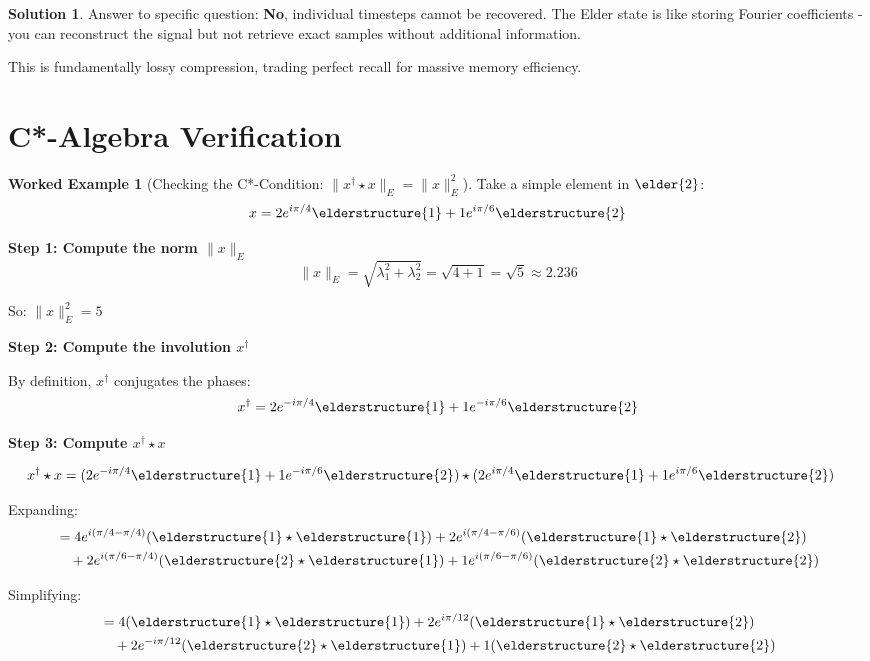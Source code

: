 \documentclass[12pt,a4paper]{article}
\theoremstyle{definition}
\newtheorem{solution}{Solution}[section]
\newtheorem{example}{Worked Example}[section]
\theoremstyle{remark}
\begin{document}
\begin{solution}
Answer to specific question: \textbf{No}, individual timesteps cannot be recovered. The Elder state is like storing Fourier coefficients - you can reconstruct the signal but not retrieve exact samples without additional information.

This is fundamentally lossy compression, trading perfect recall for massive memory efficiency.
\end{solution}

\newpage
\section{C*-Algebra Verification}

\begin{example}[Checking the C*-Condition: $\|x^{\dagger} \star x\|_E = \|x\|_E^2$]

Take a simple element in $\elder{2}$:
$$x = 2e^{i\pi/4} \elderstructure{1} + 1e^{i\pi/6} \elderstructure{2}$$

\textbf{Step 1: Compute the norm $\|x\|_E$}
$$\|x\|_E = \sqrt{\lambda_1^2 + \lambda_2^2} = \sqrt{4 + 1} = \sqrt{5} \approx 2.236$$

So: $\|x\|_E^2 = 5$

\textbf{Step 2: Compute the involution $x^{\dagger}$}

By definition, $x^{\dagger}$ conjugates the phases:
$$x^{\dagger} = 2e^{-i\pi/4} \elderstructure{1} + 1e^{-i\pi/6} \elderstructure{2}$$

\textbf{Step 3: Compute $x^{\dagger} \star x$}

\begin{align}
x^{\dagger} \star x &= (2e^{-i\pi/4} \elderstructure{1} + 1e^{-i\pi/6} \elderstructure{2}) \star (2e^{i\pi/4} \elderstructure{1} + 1e^{i\pi/6} \elderstructure{2})
\end{align}

Expanding:
\begin{align}
&= 4e^{i(\pi/4 - \pi/4)}(\elderstructure{1} \star \elderstructure{1}) + 2e^{i(\pi/4 - \pi/6)}(\elderstructure{1} \star \elderstructure{2}) \\
&\quad + 2e^{i(\pi/6 - \pi/4)}(\elderstructure{2} \star \elderstructure{1}) + 1e^{i(\pi/6 - \pi/6)}(\elderstructure{2} \star \elderstructure{2})
\end{align}

Simplifying:
\begin{align}
&= 4(\elderstructure{1} \star \elderstructure{1}) + 2e^{i\pi/12}(\elderstructure{1} \star \elderstructure{2}) \\
&\quad + 2e^{-i\pi/12}(\elderstructure{2} \star \elderstructure{1}) + 1(\elderstructure{2} \star \elderstructure{2})
\end{align}


\end{example}
\end{document}
